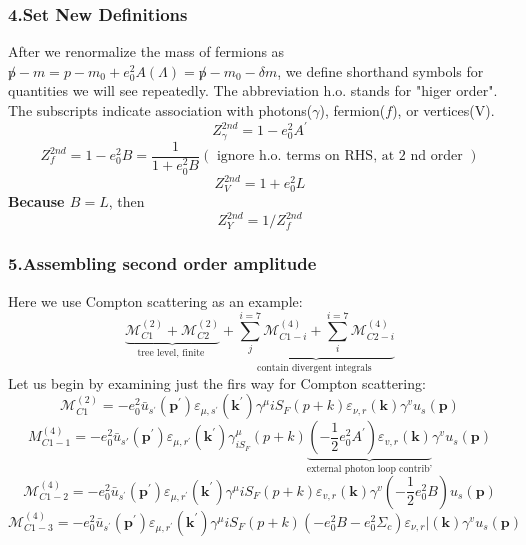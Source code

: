 \subsubsection{4.Set New Definitions}
After we renormalize the mass of fermions as $\not p-m=p-m_{0}+e_{0}^{2} A(\Lambda)=\not p-m_{0}-\delta m$, we define shorthand symbols for quantities we will see repeatedly. The abbreviation h.o. stands for "higer order". The subscripts indicate association with photons($\gamma$), fermion($f$), or vertices(V).
$$Z_{\gamma}^{2 n d}=1-e_{0}^{2} A^{\prime}$$
$$Z_{f}^{2 n d}=1-e_{0}^{2} B=\frac{1}{1+e_{0}^{2} B}(\text { ignore h.o. terms on RHS, at } 2 \text { nd order })$$
$$Z_{V}^{2 n d}=1+e_{0}^{2} L$$
\textbf{Because $B=L$}, then
$$Z_{Y}^{2 n d}=1 / Z_{f}^{2 n d}$$

\subsubsection{5.Assembling second order amplitude}
Here we use Compton scattering as an example:
$$\underbrace{\mathcal{M}_{C 1}^{(2)}+\mathcal{M}_{C 2}^{(2)}}_{\text {tree level, finite }}+\underbrace{\sum_{j}^{i=7} \mathcal{M}_{C 1-i}^{(4)}+\sum_{i}^{i=7} \mathcal{M}_{C 2-i}^{(4)}}_{\text {contain divergent integrals }}$$
Let us begin by examining just the firs way for Compton scattering:
$$\mathcal{M}_{C 1}^{(2)}=-e_{0}^{2} \bar{u}_{s^{\prime}}\left(\mathbf{p}^{\prime}\right) \varepsilon_{\mu, s^{\prime}}\left(\mathbf{k}^{\prime}\right) \gamma^{\mu}i S_{F}(p+k) \varepsilon_{\nu, r}(\mathbf{k}) \gamma^{v} u_{s}(\mathbf{p})$$
$$M_{C 1-1}^{(4)}=-e_{0}^{2} \bar{u}_{s'}\left(\mathbf{p}^{\prime}\right) \varepsilon_{\mu, r^{\prime}}\left(\mathbf{k}^{\prime}\right) \gamma^{\mu}_{i S_{F}}(p+k)\underbrace{\left(-\frac{1}{2} e_{0}^{2} A^{\prime}\right) \varepsilon_{v,r}(\mathbf{k})}_{\text{external photon loop contrib'}} \gamma^{v} u_{s}(\mathbf{p})$$
$$\mathcal{M}_{C 1-2}^{(4)}=-e_{0}^{2} \bar{u}_{s^{\prime}}\left(\mathbf{p}^{\prime}\right) \varepsilon_{\mu, r^{\prime}}\left(\mathbf{k}^{\prime}\right) \gamma^{\mu} i S_{F}(p+k) \varepsilon_{v, r}(\mathbf{k}) \gamma^{v}\left(-\frac{1}{2} e_{0}^{2} B\right) u_{s}(\mathbf{p})$$
$$\mathcal{M}_{C 1-3}^{(4)}=-e_{0}^{2} \bar{u}_{s^{\prime}}\left(\mathbf{p}^{\prime}\right) \varepsilon_{\mu, r^{\prime}}\left(\mathbf{k}^{\prime}\right) \gamma^{\mu} i S_{F}(p+k)\left(-e_{0}^{2} B-e_{0}^{2} \Sigma_{c}\right) \varepsilon_{\nu,r} |(\mathbf{k}) \gamma^{v} u_{s}(\mathbf{p})$$
